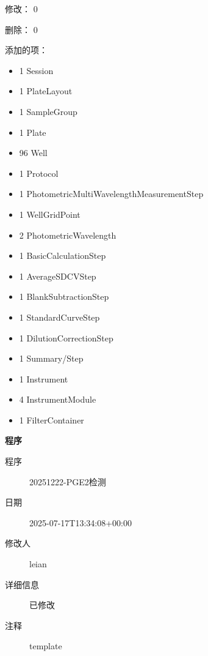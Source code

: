 \documentclass[UTF8,10pt,a4paper,fontset=fandol]{ctexart}
\newcommand{\fieldvalue}[1]{#1}
\begin{document}
\noindent
修改：
\fieldvalue{0}

\noindent
删除：
\fieldvalue{0}

\noindent
添加的项：
\begin{itemize}
\item 1 Session
\item 1 PlateLayout
\item 1 SampleGroup
\item 1 Plate
\item 96 Well
\item 1 Protocol
\item 1 PhotometricMultiWavelengthMeasurementStep
\item 1 WellGridPoint
\item 2 PhotometricWavelength
\item 1 BasicCalculationStep
\item 1 AverageSDCVStep
\item 1 BlankSubtractionStep
\item 1 StandardCurveStep
\item 1 DilutionCorrectionStep
\item 1 Summary/Step
\item 1 Instrument
\item 4 InstrumentModule
\item 1 FilterContainer
\end{itemize}

\noindent
\textbf{程序}

\begin{description}
\item[程序]
\fieldvalue{20251222-PGE2检测}

\item[日期]
\fieldvalue{2025-07-17T13:34:08+00:00}

\item[修改人]
\fieldvalue{leian}

\item[详细信息]
\fieldvalue{已修改}

\item[注释]
\fieldvalue{template}
\end{description}
\end{document}
